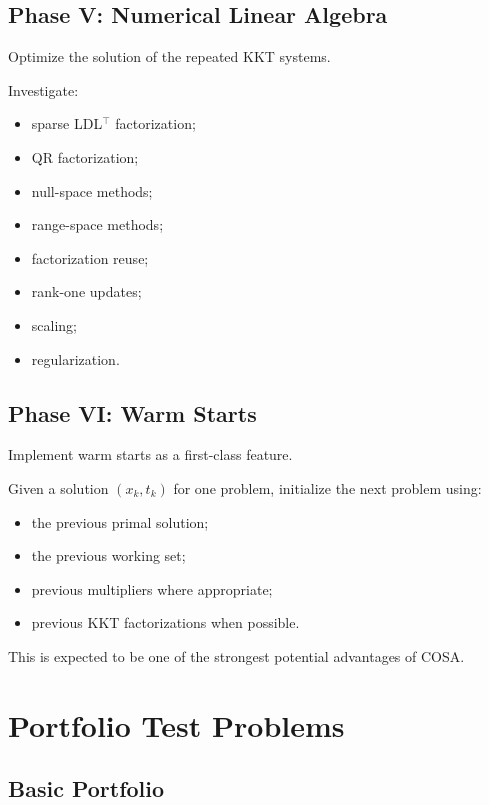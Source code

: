 \documentclass[11pt,a4paper]{article}
\begin{document}
\subsection{Phase V: Numerical Linear Algebra}

Optimize the solution of the repeated KKT systems.

Investigate:

\begin{itemize}
    \item sparse LDL$^\top$ factorization;
    \item QR factorization;
    \item null-space methods;
    \item range-space methods;
    \item factorization reuse;
    \item rank-one updates;
    \item scaling;
    \item regularization.
\end{itemize}

\subsection{Phase VI: Warm Starts}

Implement warm starts as a first-class feature.

Given a solution $(x_k,t_k)$ for one problem, initialize the next
problem using:

\begin{itemize}
    \item the previous primal solution;
    \item the previous working set;
    \item previous multipliers where appropriate;
    \item previous KKT factorizations when possible.
\end{itemize}

This is expected to be one of the strongest potential advantages of
COSA.

\section{Portfolio Test Problems}

\subsection{Basic Portfolio}
\end{document}
